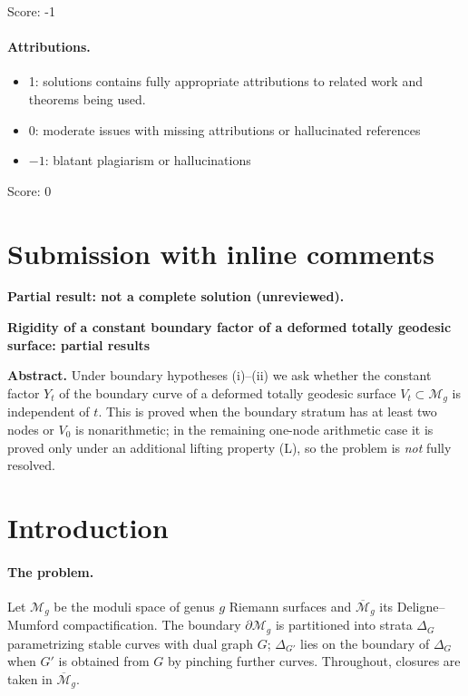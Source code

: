 \documentclass[11pt]{article}
\newcommand{\M}{\mathcal M}
\newcommand{\cl}[1]{\overline{#1}}
\theoremstyle{remark}
\begin{document}
\noindent Score: -1

\paragraph{Attributions.}
\begin{itemize}
	\item  1: solutions contains fully appropriate attributions
		to related work and theorems being used.
	\item  0: moderate issues with missing attributions or hallucinated references
	\item  $-1$: blatant plagiarism or hallucinations
\end{itemize}

\noindent Score: 0

\newpage
\section{Submission with inline comments}


\noindent\textbf{Partial result: not a complete solution (unreviewed).}\par

\begin{center}
\textbf{Rigidity of a constant boundary factor of a deformed
totally geodesic surface: partial results}
\end{center}

\noindent\textbf{Abstract.}
Under boundary hypotheses (i)--(ii) we ask whether the constant
factor \(Y_t\) of the boundary curve of a deformed totally geodesic
surface \(V_t\subset\M_g\) is independent of \(t\). This is proved
when the boundary stratum has at least two nodes or \(V_0\) is
nonarithmetic; in the remaining one-node arithmetic case
it is proved only under an additional lifting property (L), so the
problem is \emph{not} fully resolved.

\section{Introduction}

\paragraph{The problem.}
Let \(\M_g\) be the moduli space of genus \(g\) Riemann surfaces and
\(\cl{\M}_g\) its Deligne--Mumford compactification. The boundary
\(\partial\M_g\) is partitioned into strata \(\Delta_G\) parametrizing
stable curves with dual graph \(G\); \(\Delta_{G'}\) lies
on the boundary of \(\Delta_G\) when \(G'\) is obtained from \(G\) by
pinching further curves. Throughout, closures are taken in \(\cl{\M}_g\).
\end{document}
